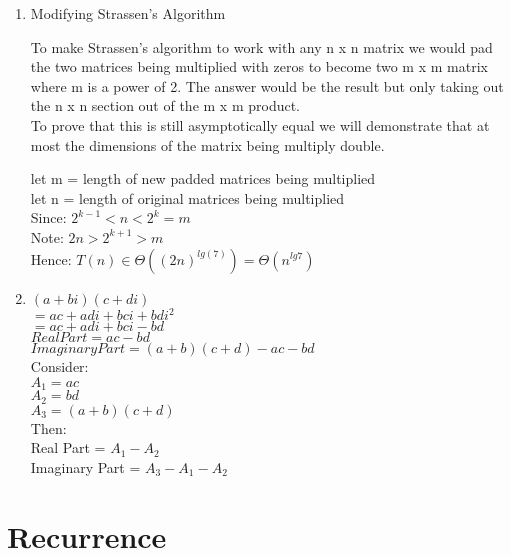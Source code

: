 \documentclass[12pt]{article}%
\begin{document}
\begin{enumerate}[label=(\alph*)]
\item Modifying Strassen's Algorithm

To make Strassen's algorithm to work with any n x n matrix we would pad the two matrices being multiplied with zeros to become two m x m matrix where m is a power of 2. The answer would be the result but only taking out the n x n section out of the m x m product.\\

To prove that this is still asymptotically equal we will demonstrate that at most the dimensions of the matrix being multiply double. 

let m = length of new padded matrices being multiplied \\
let n = length of original matrices being multiplied \\
Since:
$2^{k-1} < n < 2^k = m$\\
Note:
$2n > 2^{k+1} > m$\\
Hence:
$T(n) \in \Theta((2n)^{lg(7)}) = \Theta(n^{lg7})$


\item

$(a+bi)(c+di)$\\
$= ac + adi + bci + bdi^2$\\
$= ac + adi + bci - bd$\\
$Real Part= ac - bd$\\
$Imaginary Part= (a + b)(c+d) -ac - bd$\\

Consider:\\
$A_1 = ac$\\
$A_2 = bd$\\
$A_3 = (a+b)(c+d)$\\

Then:\\
Real Part = $A_1 - A_2$\\
Imaginary Part = $A_3 - A_1 - A_2$\\

\end{enumerate}


\section{Recurrence}
\end{document}
